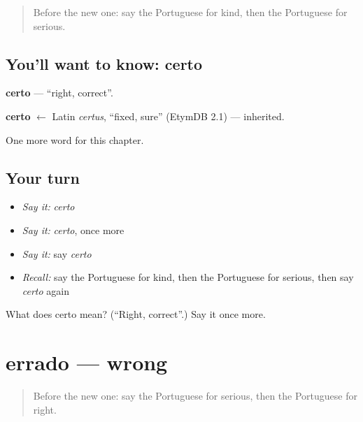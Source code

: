 \label{lesson:PT-C124-certo}



\begin{quote}
Before the new one: say the Portuguese for kind, then the Portuguese for serious.
\end{quote}

\subsection*{You'll want to know: certo}
\textbf{certo} — \textquotedblleft{}right, correct\textquotedblright{}.

\begin{cousinweb}
\textbf{certo} $\leftarrow$ Latin \emph{certus}, \textquotedblleft{}fixed, sure\textquotedblright{} (EtymDB 2.1) — inherited.
\end{cousinweb}

\begin{grammarlens}[title={What you've built}]
One more word for this chapter.
\end{grammarlens}

\subsection*{Your turn}
\begin{itemize}
\raggedright
  \item \emph{Say it:} \emph{certo}
  \item \emph{Say it:} \emph{certo}, once more
  \item \emph{Say it:} say \emph{certo}
  \item \emph{Recall:} say the Portuguese for kind, then the Portuguese for serious, then say \emph{certo} again
\end{itemize}

\begin{tcolorbox}[breakable,colback=teal!4,colframe=teal!35!black,title={Before you move on}]
What does certo mean? (\textquotedblleft{}Right, correct\textquotedblright{}.) Say it once more.
\end{tcolorbox}
\section[errado]{errado — wrong}

\label{lesson:PT-C124-errado}



\begin{quote}
Before the new one: say the Portuguese for serious, then the Portuguese for right.
\end{quote}

